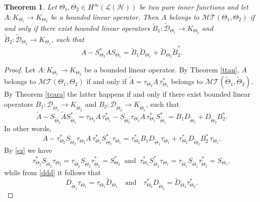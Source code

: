 \documentclass[11pt]{amsart}
\numberwithin{equation}{section}
\newcommand{\hsp}{\mathcal{H}}
\newcommand{\oL }{\mathcal{L}(\hsp) }
\newcommand{\dcf}[1]{\widetilde{D}_{\Theta_#1}}
\newcommand{\dfct}[1]{{D}_{\widetilde{\Theta}_#1}}
\newtheorem{theorem}{Theorem}[section]
\theoremstyle{definition}
\numberwithin{equation}{section}
\begin{document}
\begin{theorem}\label{tca2}
	Let $ {\Theta_1},{\Theta_2} \in H^{\infty}(\oL)$ be two pure inner functions and let $A:K_{\Theta_{1}}\rightarrow  K_{\Theta_{2}}$ be a bounded linear operator. Then $A$ belongs to $\mathcal{MT}(\Theta_{1}, \Theta_{2})$  if and only if there exist bounded linear operators \mbox{$\widetilde{B}_1:\widetilde{\mathcal{D}}_{\Theta_{1}}\rightarrow K_{\Theta_{2}}$} and $\widetilde{B}_2: \widetilde{\mathcal{D}}_{\Theta_{2}}\rightarrow K_{\Theta_{1}}$, such that
	\begin{equation}\label{cara2}
	A-S_{\Theta_2}^*AS_{\Theta_1}=\widetilde{B}_1\dcf{1}+\dcf{2}\widetilde{B}_2^*.
	\end{equation}
\end{theorem}
\begin{proof}
	Let $A:K_{\Theta_{1}}\rightarrow  K_{\Theta_{2}}$ be a bounded linear operator. By Theorem \ref{ttau}, $A$ belongs to $\mathcal{MT}(\Theta_{1}, \Theta_{2})$  if and only if $ \widetilde{A} = \tau_{\Theta_2}A\, \tau_{\Theta_1}^*$ belongs to $\mathcal{MT}(\widetilde{\Theta}_{1}, \widetilde{\Theta}_{2})$. By Theorem \ref{tcara} the latter happens if and only if there exist bounded linear operators \mbox{$B_1:\mathcal{D}_{\widetilde{\Theta}_{1}}\to K_{\widetilde{\Theta}_{2}}$} and $B_2: \mathcal{D}_{\widetilde{\Theta}_{2}}\to K_{\widetilde{\Theta}_{1}}$, such that
	\begin{equation}\label{X}
	\widetilde{A}-S_{\widetilde{\Theta}_2}\widetilde{A}S_{\widetilde{\Theta}_1}^*=	\tau_{\Theta_2}A\, \tau_{\Theta_1}^*-S_{\widetilde{\Theta}_2}\tau_{\Theta_2}A\, \tau_{\Theta_1}^*S_{\widetilde{\Theta}_1}^*=B_1\dfct{1}+\dfct{2}B_2^*.
	\end{equation}
In other words,
\begin{equation*}
	A-\tau_{\Theta_2}^*S_{\widetilde{\Theta}_2}\tau_{\Theta_2}A\, \tau_{\Theta_1}^*S_{\widetilde{\Theta}_1}^*\tau_{\Theta_1}=\tau_{\Theta_2}^*B_1\dfct{1}\tau_{\Theta_1}+\tau_{\Theta_2}^*\dfct{2}B_2^*\,\tau_{\Theta_1}.
\end{equation*}
By \eqref{sz} we have
$$\tau_{\Theta_2}^*S_{\widetilde{\Theta}_2}\tau_{\Theta_2}=\tau_{\widetilde{\Theta}_2}S_{\widetilde{\Theta}_2}\tau_{\widetilde{\Theta}_2}^*=S_{\Theta_{2}}^*\ \text{  and  }\
\tau_{\Theta_1}^*S_{\widetilde{\Theta}_1}^*\tau_{\Theta_1}=\tau_{\widetilde{\Theta}_1}S_{\widetilde{\Theta}_1}\tau_{\widetilde{\Theta}_1}^*=S_{\Theta_{1}},$$
while from \eqref{ddd} it follows that
$$\dfct{1}\tau_{\Theta_1}=\tau_{\Theta_1}\dcf{1}\quad\text{and}\quad \tau_{\Theta_2}^*\dfct{2}=\dcf{2}\tau_{\Theta_2}^*.$$

\end{proof}
\end{document}
